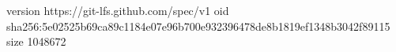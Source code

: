 version https://git-lfs.github.com/spec/v1
oid sha256:5e02525b69ca89c1184e07e96b700e932396478de8b1819ef1348b3042f89115
size 1048672
